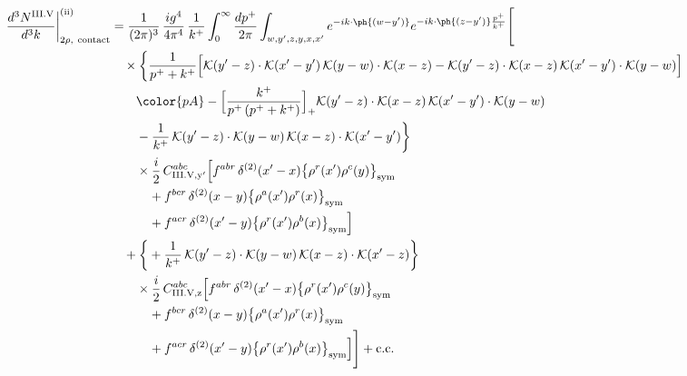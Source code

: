 \begin{align}
\frac{d^{3}N^{\rm III.V}}{d^{3}k}\bigg|^{\rm (ii)}_{2\rho,\ {\rm contact}}&=\frac{1}{(2\pi)^{3}}\,\frac{ig^{4}}{4\pi^{4}}\,\frac{1}{k^{+}}\int_{0}^{\infty}\frac{dp^{+}}{2\pi}\int_{w,y',z,y,x,x'}e^{-ik\cdot\ph{(w-y')}}e^{-ik\cdot\ph{(z-y')}\frac{p^{+}}{k^{+}}}\Bigg[\notag\\
&\quad\times\bigg\{\frac{1}{p^{+}+k^{+}}\Big[\mathcal{K}(y'-z)\cdot\mathcal{K}(x'-y')\,\mathcal{K}(y-w)\cdot\mathcal{K}(x-z)-\mathcal{K}(y'-z)\cdot\mathcal{K}(x-z)\,\mathcal{K}(x'-y')\cdot\mathcal{K}(y-w)\Big]\notag\\
&\qquad{\color{pA}-\Big[\frac{k^{+}}{p^{+}\,(p^{+}+k^{+})}\Big]_{+}\mathcal{K}(y'-z)\cdot\mathcal{K}(x-z)\,\mathcal{K}(x'-y')\cdot\mathcal{K}(y-w)}\notag\\
&\qquad-\frac{1}{k^{+}}\,\mathcal{K}(y'-z)\cdot\mathcal{K}(y-w)\,\mathcal{K}(x-z)\cdot\mathcal{K}(x'-y')\bigg\}\notag\\
&\qquad\times \frac{i}{2}\,C^{abc}_{{\rm III.V,y'}}\Big[f^{abr}\,\delta^{(2)}(x'-x)\big\{\rho^{r}(x')\rho^{c}(y)\big\}_{\rm sym}\notag\\
&\qquad\quad +f^{bcr}\,\delta^{(2)}(x-y)\big\{\rho^{a}(x')\rho^{r}(x)\big\}_{\rm sym}\notag\\
&\qquad\quad +f^{acr}\,\delta^{(2)}(x'-y)\big\{\rho^{r}(x')\rho^{b}(x)\big\}_{\rm sym}\Big]\notag\\
&\quad+\bigg\{+\frac{1}{k^{+}}\,\mathcal{K}(y'-z)\cdot\mathcal{K}(y-w)\,\mathcal{K}(x-z)\cdot\mathcal{K}(x'-z)\bigg\}\notag\\
&\qquad\times \frac{i}{2}\,C^{abc}_{{\rm III.V,z}}\Big[f^{abr}\,\delta^{(2)}(x'-x)\big\{\rho^{r}(x')\rho^{c}(y)\big\}_{\rm sym}\notag\\
&\qquad\quad +f^{bcr}\,\delta^{(2)}(x-y)\big\{\rho^{a}(x')\rho^{r}(x)\big\}_{\rm sym}\notag\\
&\qquad\quad +f^{acr}\,\delta^{(2)}(x'-y)\big\{\rho^{r}(x')\rho^{b}(x)\big\}_{\rm sym}\Big]\Bigg]+{\rm c.c.}\label{eq:D-III.V-2}
\end{align}
